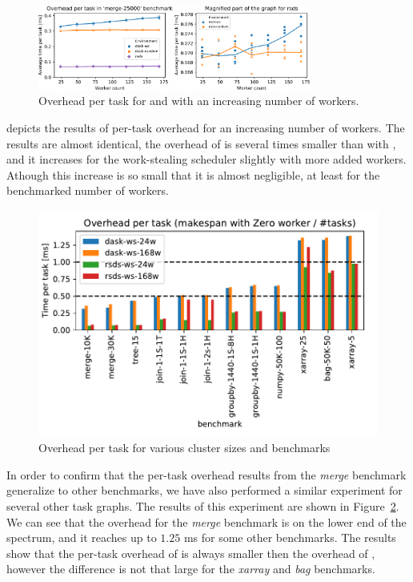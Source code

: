 \begin{figure}
	\centering
	\includegraphics[width=0.8\textwidth]{./imgs/rsds/charts/rsds-merge-worker-scaling}
	\caption{Overhead per task for \rsds{} and \dask{} with an
	increasing number of workers.}
	\label{fig:rsds-merge-worker-scaling}
\end{figure}

 depicts the results of per-task overhead for an increasing
number of workers. The results are almost identical, the overhead of \rsds{} is
several times smaller than with \dask{}, and it increases for the work-stealing
scheduler slightly with more added workers. Athough this increase is so small that it is almost
negligible, at least for the benchmarked number of workers.

\begin{figure}
	\centering
	\includegraphics[width=0.8\columnwidth]{./imgs/rsds/charts/rsds-dask-overhead-all}
	\caption{Overhead per task for various cluster sizes and benchmarks}
	\label{fig:rsds-dask-overhead-all}
\end{figure}

In order to confirm that the per-task overhead results from the \emph{merge}
benchmark generalize to other benchmarks, we have also performed a similar experiment for several
other task graphs. The results of this experiment are shown in Figure~\ref{fig:rsds-dask-overhead-all}.
We can see that the overhead for the \emph{merge} benchmark is on the lower end of
the spectrum, and it reaches up to $1.25$ ms for some other benchmarks. The
results show that the per-task overhead of \rsds{} is always smaller then the
overhead of \dask{}, however the difference is not that large for the
\emph{xarray} and \emph{bag} benchmarks.

